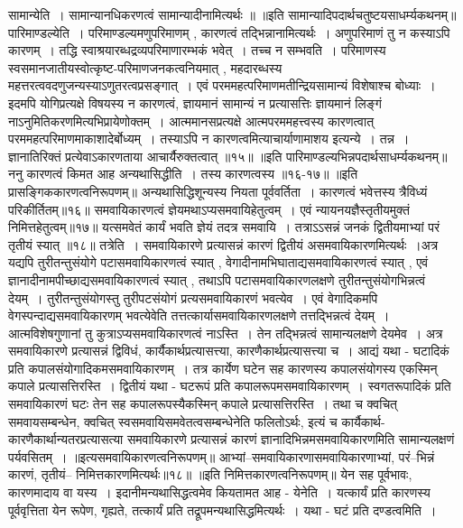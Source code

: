 सामान्येति~। सामान्यानधिकरणत्वं सामान्यादीनामित्यर्थः ॥
॥इति सामान्यादिपदार्थचतुष्टयसाधर्म्यकथनम्॥
पारिमाण्डल्येति~। परिमाण्डल्यमणुपरिमाणम् , कारणत्वं तद्भिन्नानामित्यर्थः~। अणुपरिमाणं तु न कस्याऽपि कारणम्~। तद्धि स्वाश्रयारब्धद्रव्यपरिमाणारम्भकं भवेत्~।
तच्च न सम्भवति~। परिमाणस्य स्वसमानजातीयस्वोत्कृष्ट-परिमाणजनकत्वनियमात् , महदारब्धस्य महत्तरत्ववदणुजन्यस्याऽणुतरत्वप्रसङ्गात्~। एवं परममहत्परिमाणमतीन्द्रियसामान्यं
विशेषाश्च बोध्याः~।
इदमपि योगिप्रत्यक्षे विषयस्य न कारणत्वं, ज्ञायमानं सामान्यं न प्रत्यासत्तिः ज्ञायमानं लिङ्गं नाऽनुमितिकरणमित्यभिप्रायेणोक्तम्~। आत्ममानसप्रत्यक्षे
आत्मपरममहत्त्वस्य कारणत्वात् परममहत्परिमाणमाकाशादेर्बोध्यम्~। तस्याऽपि न कारणत्वमित्याचार्याणामाशय इत्यन्ये~। तन्न~। ज्ञानातिरिक्तं प्रत्येवाऽकारणताया
आचार्यैरुक्तत्वात् ॥१५॥
॥इति पारिमाण्डल्यभिन्नपदार्थसाधर्म्यकथनम्॥
ननु कारणत्वं किमत आह अन्यथासिद्धीति~। तस्य कारणत्वस्य ॥१६-१७॥
॥इति प्रासङ्गिककारणत्वनिरूपणम्॥
अन्यथासिद्धिशून्यस्य नियता पूर्ववर्तिता~।
कारणत्वं भवेत्तस्य त्रैविध्यं परिकीर्तितम्॥१६॥
समवायिकारणत्वं ज्ञेयमथाऽप्यसमवायिहेतुत्वम्~।
एवं न्यायनयज्ञैस्तृतीयमुक्तं निमित्तहेतुत्वम्॥१७॥
यत्समवेतं कार्यं भवति ज्ञेयं तदत्र समवायि~।
तत्राऽऽसन्नं जनकं द्वितीयमाभ्यां परं तृतीयं स्यात् ॥१८॥
तत्रेति~। समवायिकारणे प्रत्यासन्नं कारणं द्वितीयं असमवायिकारणमित्यर्थः~।अत्र यद्यपि तुरीतन्तुसंयोगे पटासमवायिकारणत्वं स्यात् , वेगादीनामभिघाताद्यसमवायिकारणत्वं स्यात् ,
एवं ज्ञानादीनामपीच्छाद्यसमवायिकारणत्वं स्यात् , तथाऽपि पटासमवायिकारणलक्षणे तुरीतन्तुसंयोगभिन्नत्वं देयम्~। तुरीतन्तुसंयोगस्तु तुरीपटसंयोगं
प्रत्यसमवायिकारणं भवत्येव~। एवं वेगादिकमपि वेगस्पन्दाद्यसमवायिकारणम् भवत्येवेति तत्तत्कार्यासमवायिकारणलक्षणे तत्तद्भिन्नत्वं देयम्~। आत्मविशेषगुणानां तु
कुत्राऽप्यसमवायिकारणत्वं नाऽस्ति~। तेन तद्भिन्नत्वं सामान्यलक्षणे देयमेव~। अत्र समवायिकारणे प्रत्यासन्नं द्विविधं, कार्यैकार्थप्रत्यासत्त्या, कारणैकार्थप्रत्यासत्त्या च~।
आद्यं यथा - घटादिकं प्रति कपालसंयोगादिकमसमवायिकारणम्~। तत्र कार्येण घटेन सह कारणस्य कपालसंयोगस्य एकस्मिन् कपाले प्रत्यासत्तिरस्ति~।
द्वितीयं यथा - घटरूपं प्रति कपालरूपमसमवायिकारणम्~। स्वगतरूपादिकं प्रति समवायिकारणं घटः तेन सह कपालरूपस्यैकस्मिन् कपाले प्रत्यासत्तिरस्ति~। तथा च क्वचित् समवायसम्बन्धेन,
क्वचित् स्वसमवायिसमवेतत्वसम्बन्धेनेति फलितोऽर्थः, इत्यं च कार्यैकार्थ-कारणैकार्थान्यतरप्रत्यासत्या समवायिकारणे प्रत्यासन्नं कारणं ज्ञानादिभिन्नमसमवायिकारणमिति
सामान्यलक्षणं पर्यवसितम्~।
॥इत्यसमवायिकारणत्वनिरूपणम्॥
आभ्यां--समवायिकारणासमवायिकारणाभ्यां, परं--भिन्नं कारणं, तृतीयं--
निमित्तकारणमित्यर्थः॥१८॥
॥इति निमित्तकारणत्वनिरूपणम्॥
येन सह पूर्वभावः, कारणमादाय वा यस्य~।
इदानीमन्यथासिद्धत्वमेव कियतामत आह - येनेति~। यत्कार्यं प्रति कारणस्य पूर्ववृत्तिता येन रूपेण, गृह्यते, तत्कार्यं प्रति तद्रूपमन्यथासिद्धमित्यर्थः~। यथा - घटं प्रति दण्डत्वमिति~।
